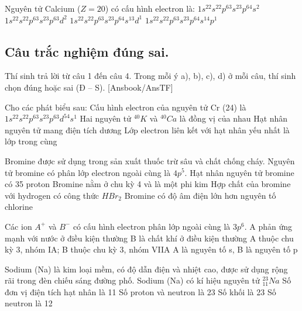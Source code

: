 	\begin{ex}
		Nguyên tử Calcium ($Z=20$) có cấu hình electron là:
		\choice
		{$1s^22s^22p^63s^23p^64s^2$}
		{$1s^22s^22p^63s^23p^63d^2$}
		{$1s^22s^22p^63s^23p^64s^13d^1$}
		{$1s^22s^22p^63s^23p^64s^14p^1$}
		\loigiai{}
	\end{ex}

\subsection{Câu trắc nghiệm đúng sai.} Thí sinh trả lời từ câu 1 đến câu 4. Trong mỗi ý a), b), c), d) ở mỗi câu, thí sinh chọn đúng hoặc sai (Đ – S).
[Ansbook/AnsTF]
	\begin{ex}
		Cho các phát biểu sau:
		\choiceTF
		{Cấu hình electron của nguyên tử Cr (24) là $1s^22s^22p^63s^23p^63d^54s^1$}
		{Hai nguyên tử $^{40}K$ và $^{40}Ca$ là đồng vị của nhau}
		{Hạt nhân nguyên tử mang điện tích dương}
		{Lớp electron liên kết với hạt nhân yếu nhất là lớp trong cùng}
		\loigiai{}
	\end{ex}
	
	\begin{ex}
		Bromine được sử dụng trong sản xuất thuốc trừ sâu và chất chống cháy. Nguyên tử bromine có phân lớp electron ngoài cùng là $4p^5$.
		\choiceTF
		{Hạt nhân nguyên tử bromine có 35 proton}
		{Bromine nằm ở chu kỳ 4 và là một phi kim}
		{Hợp chất của bromine với hydrogen có công thức $HBr_2$}
		{Bromine có độ âm điện lớn hơn nguyên tố chlorine}
		\loigiai{}
	\end{ex}
	
	\begin{ex}
		Các ion $A^+$ và $B^-$ có cấu hình electron phân lớp ngoài cùng là $3p^6$.
		\choiceTF
			{A phản ứng mạnh với nước ở điều kiện thường}
			{B là chất khí ở điều kiện thường}
			{A thuộc chu kỳ 3, nhóm IA; B thuộc chu kỳ 3, nhóm VIIA}
		    {A là nguyên tố s, B là nguyên tố p}
			\loigiai{}
	\end{ex}
	
	\begin{ex}
		Sodium (Na) là kim loại mềm, có độ dẫn điện và nhiệt cao, được sử dụng rộng rãi trong đèn chiếu sáng đường phố. Sodium (Na) có kí hiệu nguyên tử $^{23}_{11}Na$
		\choiceTF
		{Số đơn vị điện tích hạt nhân là 11}
		{Số proton và neutron là 23}
		{Số khối là 23}
		{Số neutron là 12}
		\loigiai{}
	\end{ex}

